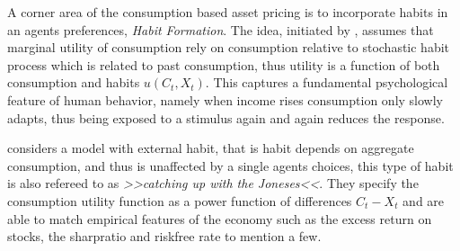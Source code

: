 \begin{comment}
We show that the model of \citet{Campbell1999} is capable of generating returns consistent with the empirical findings of \citet{Henkel2011}. That is returns which inherits the properties that they are predicable in recession but unpredictable in expansions.\\

\citet{Henkel2011} found that the predictability of returns using popular measures such as the dividend yield diminishes in expansions while remaining of significance during recessionary periods. \\

We simulate an economy according to \cite{Campbell1999}, and re-calibrate the parameters of the model to an extended period spanning \textit{1950-2018} compared to \citep{Campbell1999}'s \textit{1950-1994}. In an attempt to incorporate relevant information of the Great Financial Crisis of 2008 in our calibration.




Predictability of asset prices in expansions is a desirable capability since the economy is in a state of expansion more often than recession. In the period $1950-2018$\footnote{According to \cite{USREC}} the economy has been in recession $13.41\%$ of the time, hence being able to predict asset prices in expansions would yield a higher profit for investors.
\end{comment}

A corner area of the consumption based asset pricing is to incorporate habits in an agents preferences, \textit{Habit Formation}. The idea, initiated by \citet{Constantinides_1990}, assumes that marginal utility of consumption rely on consumption relative to stochastic habit process which is related to past consumption, thus utility is a function of both consumption and habits $u \left(C_t, X_t \right)$. This captures a fundamental psychological feature of human behavior, namely when income rises consumption only slowly adapts, thus being exposed to a stimulus again and again reduces the response. 

\citet{Campbell1999} considers a model with external habit, that is habit depends on aggregate consumption, and thus is unaffected by a single agents choices, this type of habit is also refereed to as \textit{>>catching up with the Joneses<<}. They specify the consumption utility function as a power function of differences $C_t - X_t$ and are able to match empirical features of the economy such as the excess return on stocks, the sharpratio and riskfree rate to mention a few. 

